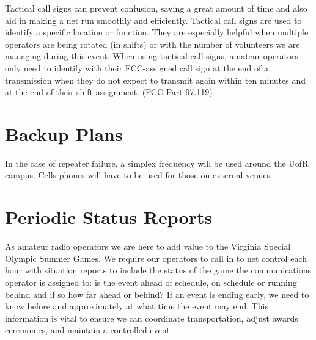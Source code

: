 \documentclass[pdflatex,letterpaper,twoside,12pt]{book}
\begin{document}
Tactical call signs can prevent confusion, saving a great amount of time and also aid in making a net run smoothly and efficiently.  Tactical call signs are used to identify a specific location or function.  They are especially helpful when multiple operators are being rotated (in shifts) or with the number of volunteers we are managing during this event.  When using tactical call signs, amateur operators only need to identify with their FCC-assigned call sign at the end of a transmission when they do not expect to transmit again within ten minutes and at the end of their shift assignment. (FCC Part 97.119)



\section{Backup Plans}

In the case of repeater failure, a simplex frequency will be used around the UofR campus.  Cells phones will have to be used for those on external venues.


\section{Periodic Status Reports}

As amateur radio operators we are here to add value to the Virginia Special Olympic Summer Games.  We require our operators to call in to net control each hour with situation reports to include the status of the game the communications operator is assigned to: is the event ahead of schedule, on schedule or running behind and if so how far ahead or behind?  If an event is ending early, we need to know before and approximately at what time the event may end.  This information is vital to ensure we can coordinate transportation, adjust awards ceremonies, and maintain a controlled event.
\end{document}
